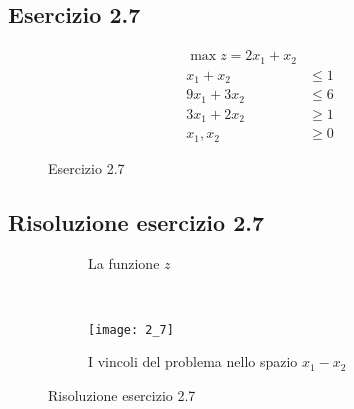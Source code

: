 \documentclass[\main/main.tex]{subfiles}
\begin{document}
\subsection{Esercizio 2.7}

\begin{figure}
  \begin{align*}
    \max z = 2x_1 + x_2  \\
    x_1 + x_2   & \leq 1 \\
    9x_1 + 3x_2 & \leq 6 \\
    3x_1 + 2x_2 & \geq 1 \\
    x_1, x_2    & \geq 0
  \end{align*}
  \caption{Esercizio 2.7}
\end{figure}

\subsection{Risoluzione esercizio 2.7}

\begin{figure}
  \begin{subfigure}{0.45\textwidth}
    \caption{La funzione $z$}
  \end{subfigure}
  ~
  \begin{subfigure}{0.45\textwidth}
    \texttt{[image: 2\_7]}
    \caption{I vincoli del problema nello spazio $x_1 - x_2$}
  \end{subfigure}
  \caption{Risoluzione esercizio 2.7}
\end{figure}
\end{document}
